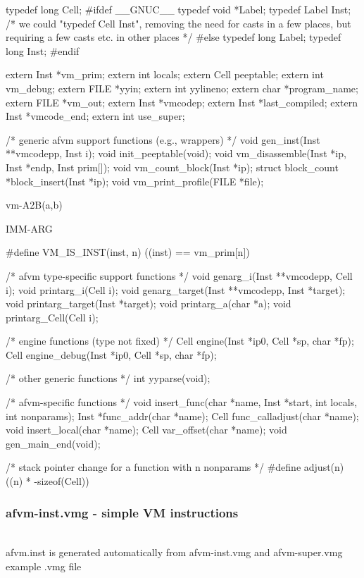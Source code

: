 \documentclass[10pt,english]{article}
\begin{document}
typedef long Cell;
#ifdef __GNUC__
typedef void *Label;
typedef Label Inst; /* we could "typedef Cell Inst", removing the need
                       for casts in a few places, but requiring a few
                       casts etc. in other places */
#else
typedef long Label;
typedef long Inst;
#endif

extern Inst *vm_prim;
extern int locals;
extern Cell peeptable;
extern int vm_debug;
extern FILE *yyin;
extern int yylineno;
extern char *program_name;
extern FILE *vm_out;
extern Inst *vmcodep;
extern Inst *last_compiled;
extern Inst *vmcode_end;
extern int use_super;

/* generic afvm support functions (e.g., wrappers) */
void gen_inst(Inst **vmcodepp, Inst i);
void init_peeptable(void);
void vm_disassemble(Inst *ip, Inst *endp, Inst prim[]);
void vm_count_block(Inst *ip);
struct block_count *block_insert(Inst *ip);
void vm_print_profile(FILE *file);

\LA{}vm-A2B(a,b)~{\nwtagstyle{}}\RA{}

\LA{}IMM-ARG~{\nwtagstyle{}}\RA{}

#define VM_IS_INST(inst, n) ((inst) == vm_prim[n])

/* afvm type-specific support functions */
void genarg_i(Inst **vmcodepp, Cell i);
void printarg_i(Cell i);
void genarg_target(Inst **vmcodepp, Inst *target);
void printarg_target(Inst *target);
void printarg_a(char *a);
void printarg_Cell(Cell i);

/* engine functions (type not fixed) */
Cell engine(Inst *ip0, Cell *sp, char *fp);
Cell engine_debug(Inst *ip0, Cell *sp, char *fp);

/* other generic functions */
int yyparse(void);

/* afvm-specific functions */
void insert_func(char *name, Inst *start, int locals, int nonparams);
Inst *func_addr(char *name);
Cell func_calladjust(char *name);
void insert_local(char *name);
Cell var_offset(char *name);
void gen_main_end(void);

/* stack pointer change for a function with n nonparams */
#define adjust(n)  ((n) * -sizeof(Cell))
\nwendcode{}\nwdocspar


\subsubsection{afvm-inst.vmg - simple VM instructions}

\nwenddocs{}\endmoddef
\\ afvm.inst is generated automatically from afvm-inst.vmg and afvm-super.vmg
\\ example .vmg file
\end{document}
